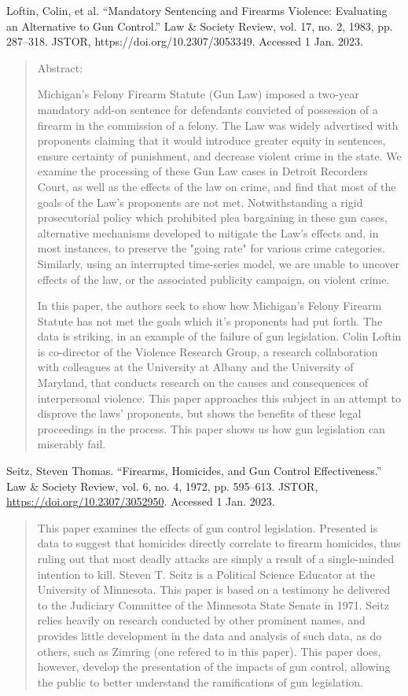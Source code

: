 \documentclass [12pt]{article}
\newcommand{\bibent}{\noindent \hangindent 40pt}
\newcommand{\bibannote}{\begin{quotation}}
\newcommand{\bibendote}{\end{quotation}}
\begin{document}
\bibent Loftin, Colin, et al. “Mandatory Sentencing and Firearms Violence: Evaluating an Alternative to Gun Control.” Law \& Society Review, vol. 17, no. 2, 1983, pp. 287–318. JSTOR, https://doi.org/10.2307/3053349. Accessed 1 Jan. 2023.
\bibannote
Abstract: \par Michigan's Felony Firearm Statute (Gun Law) imposed a two-year mandatory add-on sentence for defendants convicted of possession of a firearm in the commission of a felony. The Law was widely advertised with proponents claiming that it would introduce greater equity in sentences, ensure certainty of punishment, and decrease violent crime in the state. We examine the processing of these Gun Law cases in Detroit Recorders Court, as well as the effects of the law on crime, and find that most of the goals of the Law's proponents are not met. Notwithstanding a rigid prosecutorial policy which prohibited plea bargaining in these gun cases, alternative mechanisms developed to mitigate the Law's effects and, in most instances, to preserve the "going rate" for various crime categories. Similarly, using an interrupted time-series model, we are unable to uncover effects of the law, or the associated publicity campaign, on violent crime. \par
In this paper, the authors seek to show how Michigan's Felony Firearm Statute has not met the goals which it's proponents had put forth. The data is striking, in an example of the failure of gun legislation. Colin Loftin is co-director of the Violence Research Group, a research collaboration with colleagues at the University at Albany and the University of Maryland, that conducts research on the causes and consequences of interpersonal violence. This paper approaches this subject in an attempt to disprove the laws' proponents, but shows the benefits of these legal proceedings in the process. This paper shows us how gun legislation can miserably fail.
\bibendote

\bibent Seitz, Steven Thomas. “Firearms, Homicides, and Gun Control Effectiveness.” Law \& Society Review, vol. 6, no. 4, 1972, pp. 595–613. JSTOR, \url{https://doi.org/10.2307/3052950}. Accessed 1 Jan. 2023.
\bibannote
This paper examines the effects of gun control legislation. Presented is data to suggest that homicides directly correlate to firearm homicides, thus ruling out that most deadly attacks are simply a result of a single-minded intention to kill. Steven T. Seitz is a Political Science Educator at the University of Minnesota. This paper is based on a testimony he delivered to the Judiciary Committee of the Minnesota State Senate in 1971. Seitz relies heavily on research conducted by other prominent names, and provides little development in the data and analysis of such data, as do others, such as Zimring (one refered to in this paper). This paper does, however, develop the presentation of the impacts of gun control, allowing the public to better understand the ramifications of gun legislation.
\bibendote
\end{document}
